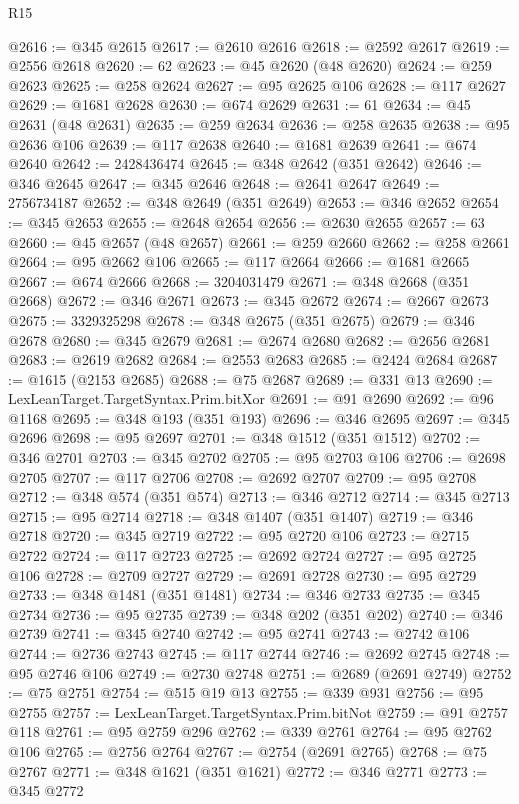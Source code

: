 \begin{lexlean}{R15}
\begin{coremodule}
{{{{{{{{{{{{{{{{{{{{{{{{{{{{{{{{{{{{{{{{{{{{{{{{{{{{{{{{{{{{{{{{{{{{{{@2616 := @345 @2615
@2617 := @2610 @2616
@2618 := @2592 @2617
@2619 := @2556 @2618
@2620 := 62
@2623 := @45 @2620 (@48 @2620)
@2624 := @259 @2623
@2625 := @258 @2624
@2627 := @95 @2625 @106
@2628 := @117 @2627
@2629 := @1681 @2628
@2630 := @674 @2629
@2631 := 61
@2634 := @45 @2631 (@48 @2631)
@2635 := @259 @2634
@2636 := @258 @2635
@2638 := @95 @2636 @106
@2639 := @117 @2638
@2640 := @1681 @2639
@2641 := @674 @2640
@2642 := 2428436474
@2645 := @348 @2642 (@351 @2642)
@2646 := @346 @2645
@2647 := @345 @2646
@2648 := @2641 @2647
@2649 := 2756734187
@2652 := @348 @2649 (@351 @2649)
@2653 := @346 @2652
@2654 := @345 @2653
@2655 := @2648 @2654
@2656 := @2630 @2655
@2657 := 63
@2660 := @45 @2657 (@48 @2657)
@2661 := @259 @2660
@2662 := @258 @2661
@2664 := @95 @2662 @106
@2665 := @117 @2664
@2666 := @1681 @2665
@2667 := @674 @2666
@2668 := 3204031479
@2671 := @348 @2668 (@351 @2668)
@2672 := @346 @2671
@2673 := @345 @2672
@2674 := @2667 @2673
@2675 := 3329325298
@2678 := @348 @2675 (@351 @2675)
@2679 := @346 @2678
@2680 := @345 @2679
@2681 := @2674 @2680
@2682 := @2656 @2681
@2683 := @2619 @2682
@2684 := @2553 @2683
@2685 := @2424 @2684
@2687 := @1615 (@2153 @2685)
@2688 := @75 @2687
@2689 := @331 @13
@2690 := LexLeanTarget.TargetSyntax.Prim.bitXor
@2691 := @91 @2690
@2692 := @96 @1168
@2695 := @348 @193 (@351 @193)
@2696 := @346 @2695
@2697 := @345 @2696
@2698 := @95 @2697
@2701 := @348 @1512 (@351 @1512)
@2702 := @346 @2701
@2703 := @345 @2702
@2705 := @95 @2703 @106
@2706 := @2698 @2705
@2707 := @117 @2706
@2708 := @2692 @2707
@2709 := @95 @2708
@2712 := @348 @574 (@351 @574)
@2713 := @346 @2712
@2714 := @345 @2713
@2715 := @95 @2714
@2718 := @348 @1407 (@351 @1407)
@2719 := @346 @2718
@2720 := @345 @2719
@2722 := @95 @2720 @106
@2723 := @2715 @2722
@2724 := @117 @2723
@2725 := @2692 @2724
@2727 := @95 @2725 @106
@2728 := @2709 @2727
@2729 := @2691 @2728
@2730 := @95 @2729
@2733 := @348 @1481 (@351 @1481)
@2734 := @346 @2733
@2735 := @345 @2734
@2736 := @95 @2735
@2739 := @348 @202 (@351 @202)
@2740 := @346 @2739
@2741 := @345 @2740
@2742 := @95 @2741
@2743 := @2742 @106
@2744 := @2736 @2743
@2745 := @117 @2744
@2746 := @2692 @2745
@2748 := @95 @2746 @106
@2749 := @2730 @2748
@2751 := @2689 (@2691 @2749)
@2752 := @75 @2751
@2754 := @515 @19 @13
@2755 := @339 @931
@2756 := @95 @2755
@2757 := LexLeanTarget.TargetSyntax.Prim.bitNot
@2759 := @91 @2757 @118
@2761 := @95 @2759 @296
@2762 := @339 @2761
@2764 := @95 @2762 @106
@2765 := @2756 @2764
@2767 := @2754 (@2691 @2765)
@2768 := @75 @2767
@2771 := @348 @1621 (@351 @1621)
@2772 := @346 @2771
@2773 := @345 @2772
}}}}}}}}}}}}}}}}}}}}}}}}}}}}}}}}}}}}}}}}}}}}}}}}}}}}}}}}}}}}}}}}}}}}}}
\end{coremodule}
\end{lexlean}
